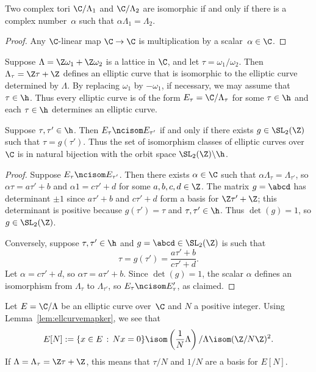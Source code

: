 \documentclass{report}
\begin{document}
\begin{lemma}
Two complex tori $\C/\Lambda_1$ and $\C/\Lambda_2$ are isomorphic
if and only if there is a complex number~$\alpha$ such that
$\alpha \Lambda_1 = \Lambda_2$.
\end{lemma}
\begin{proof}
Any $\C$-linear map $\C\to\C$ is multiplication by a
scalar~$\alpha\in\C$.
\end{proof}

Suppose $\Lambda=\Z\omega_1 +\Z\omega_2$ is a lattice in $\C$, and
let $\tau=\omega_1/\omega_2$.  Then $\Lambda_{\tau} = \Z\tau + \Z$
defines an elliptic curve that is isomorphic to the elliptic curve
determined by $\Lambda$.  By replacing $\omega_1$ by $-\omega_1$,
if necessary, we may assume that $\tau\in\h$. Thus every elliptic
curve is of the form $E_{\tau} = \C/\Lambda_{\tau}$ for some
$\tau\in\h$ and each $\tau\in\h$ determines an elliptic curve.


\begin{proposition}\label{prop:sltwoorbits}
Suppose $\tau, \tau'\in\h$.  Then $E_\tau\ncisom E_{\tau'}$ if and
only if there exists $g\in\SL_2(\Z)$ such that $\tau=g(\tau')$.
Thus the set of isomorphism classes of elliptic curves over~$\C$
is in natural bijection with the orbit space
$\SL_2(\Z)\backslash\h$.
\end{proposition}
\begin{proof}
Suppose $E_\tau\ncisom E_{\tau'}$.  Then there exists $\alpha\in\C$
such that $\alpha\Lambda_\tau = \Lambda_{\tau'}$, so $\alpha\tau =
a\tau' + b$ and $\alpha 1 = c\tau' + d$ for some $a,b,c,d\in\Z$.
The matrix $g=\abcd$ has determinant $\pm 1$ since $a\tau'+b$ and
$c\tau'+d$ form a basis for $\Z\tau'+\Z$; this determinant is
positive because $g(\tau')=\tau$ and $\tau, \tau'\in\h$. Thus
$\det(g)=1$, so $g\in\SL_2(\Z)$.

Conversely, suppose $\tau,\tau'\in\h$ and $g=\abcd\in \SL_2(\Z)$
is such that $$\tau=g(\tau')=\frac{a\tau'+b}{c\tau'+d}.$$ Let
$\alpha = c\tau' + d$, so $\alpha\tau = a\tau'+b$.  Since
$\det(g)=1$, the scalar $\alpha$ defines an isomorphism from
$\Lambda_\tau$ to $\Lambda_{\tau'}$, so $E_\tau\ncisom E_\tau'$, as
claimed.
\end{proof}


Let $E=\C/\Lambda$ be an elliptic curve over~$\C$ and $N$ a
positive integer.  Using Lemma~\ref{lem:ellcurvemapker}, we see
that
\[
  E[N] := \{x \in E \,:\, Nx = 0\} \isom \left(\frac{1}{N}\Lambda\right) /
  \Lambda \isom (\Z/N\Z)^2.
\]
If $\Lambda=\Lambda_\tau = \Z\tau + \Z$, this means that $\tau/N$
and $1/N$ are a basis for $E[N]$.
\end{document}
